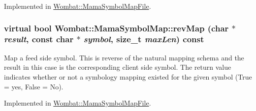 Implemented in \hyperlink{classWombat_1_1MamaSymbolMapFile_afbc6713633e4748ce4d35c9fbaac2721}{Wombat::MamaSymbolMapFile}.\hypertarget{classWombat_1_1MamaSymbolMap_ae6807122277f6e8fe9ac5a2a07725ccf}{
\subsubsection[{revMap}]{\setlength{\rightskip}{0pt plus 5cm}virtual bool Wombat::MamaSymbolMap::revMap (char $\ast$ {\em result}, \/  const char $\ast$ {\em symbol}, \/  size\_\-t {\em maxLen}) const}}
\label{classWombat_1_1MamaSymbolMap_ae6807122277f6e8fe9ac5a2a07725ccf}


Map a feed side symbol. This is reverse of the natural mapping schema and the result in this case is the corresponding client side symbol. The return value indicates whether or not a symbology mapping existed for the given symbol (True = yes, False = No). 

Implemented in \hyperlink{classWombat_1_1MamaSymbolMapFile_a5547093417653f35d964c39f7e806374}{Wombat::MamaSymbolMapFile}.